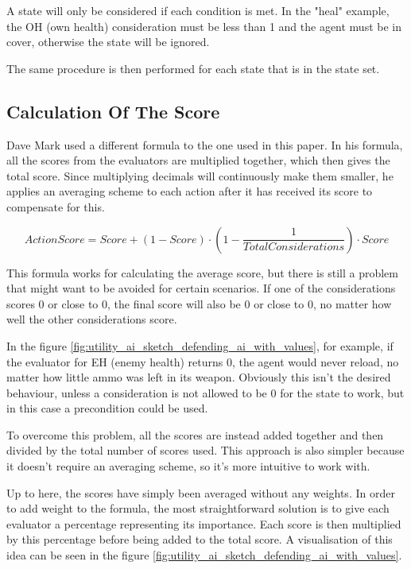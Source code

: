 A state will only be considered if each condition is met. In the "heal" example, the OH (own health) consideration must be less than 1 and the agent must be in cover, otherwise the state will be ignored.

The same procedure is then performed for each state that is in the state set.

\newpage

\subsection{Calculation Of The Score}
\label{subsec:utilityai_howitworks_calculationofthescore}

Dave Mark used a different formula to the one used in this paper. In his formula, all the scores from the evaluators are multiplied together, which then gives the total score. Since multiplying decimals will continuously make them smaller, he applies an averaging scheme to each action after it has received its score to compensate for this.

\begin{equation}
ActionScore = Score + \left(1 - Score\right) \cdot \left(1 - \frac{1}{TotalConsiderations}\right) \cdot Score
\end{equation}

This formula works for calculating the average score, but there is still a problem that might want to be avoided for certain scenarios. If one of the considerations scores 0 or close to 0, the final score will also be 0 or close to 0, no matter how well the other considerations score. \cite{UtilityAiTalk}

In the figure \ref{fig:utility_ai_sketch_defending_ai_with_values}, for example, if the evaluator for EH (enemy health) returns 0, the agent would never reload, no matter how little ammo was left in its weapon. Obviously this isn't the desired behaviour, unless a consideration is not allowed to be 0 for the state to work, but in this case a precondition could be used.

To overcome this problem, all the scores are instead added together and then divided by the total number of scores used. This approach is also simpler because it doesn't require an averaging scheme, so it's more intuitive to work with.

Up to here, the scores have simply been averaged without any weights. In order to add weight to the formula, the most straightforward solution is to give each evaluator a percentage representing its importance. Each score is then multiplied by this percentage before being added to the total score. A visualisation of this idea can be seen in the figure \ref{fig:utility_ai_sketch_defending_ai_with_values}.

